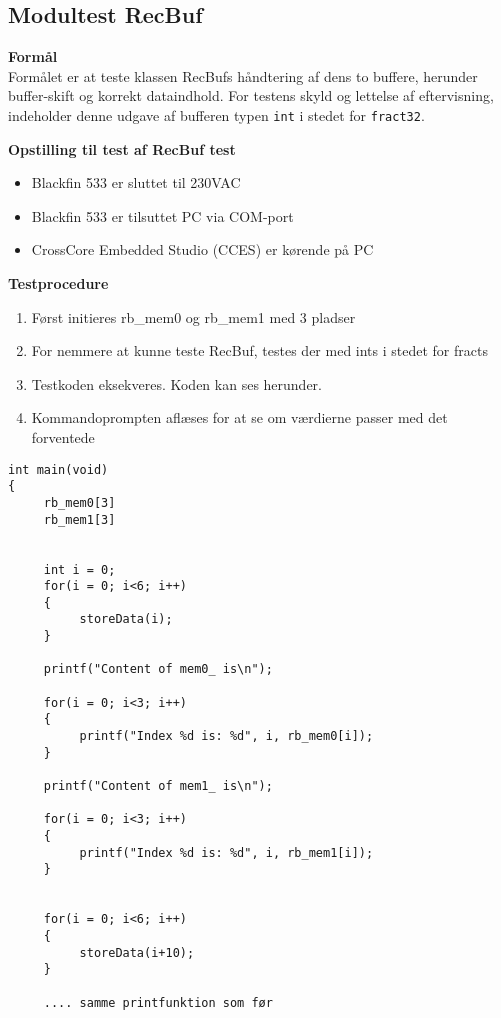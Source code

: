\subsection{Modultest RecBuf}

\textbf{Formål} \\
Formålet er at teste klassen RecBufs håndtering af dens to buffere, herunder buffer-skift og korrekt dataindhold. For testens skyld og lettelse af eftervisning, indeholder denne udgave af bufferen typen \verb+int+ i stedet for \verb+fract32+.

\textbf{Opstilling til test af RecBuf test}

\begin{itemize}
	\item Blackfin 533 er sluttet til 230VAC
	\item Blackfin 533 er tilsuttet PC via COM-port
	\item CrossCore Embedded Studio (CCES) er kørende på PC
\end{itemize}

\textbf{Testprocedure}
\begin{enumerate}
	\item Først initieres rb\_mem0 og rb\_mem1 med 3 pladser  
	\item For nemmere at kunne teste RecBuf, testes der med ints i stedet for fracts
	\item Testkoden eksekveres. Koden kan ses herunder. 
	\item Kommandoprompten aflæses for at se om værdierne passer med det forventede
\end{enumerate}

\begin{verbatim}
int main(void)
{
     rb_mem0[3]
     rb_mem1[3]
     
     
     int i = 0;
     for(i = 0; i<6; i++)
     {
          storeData(i);
     }
     
     printf("Content of mem0_ is\n");
     
     for(i = 0; i<3; i++)
     {
          printf("Index %d is: %d", i, rb_mem0[i]);
     }
     
     printf("Content of mem1_ is\n");
     
     for(i = 0; i<3; i++)
     {
          printf("Index %d is: %d", i, rb_mem1[i]);
     }


     for(i = 0; i<6; i++)
     {
          storeData(i+10);
     }
     
     .... samme printfunktion som før      
\end{verbatim}

